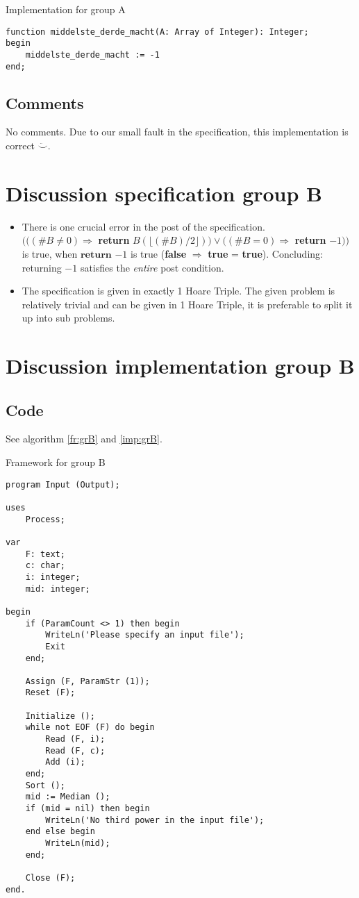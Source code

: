 \documentclass[a4paper,twoside,11pt]{article}
\begin{document}
\begin{algorithm}
\caption{Implementation for group A}
\label{imp:grA}
\begin{lstlisting}
function middelste_derde_macht(A: Array of Integer): Integer;
begin
    middelste_derde_macht := -1
end;
\end{lstlisting}
\end{algorithm}

\subsection{Comments}
No comments. Due to our small fault in the specification, this implementation is correct $\ddot\smile$.

\section{Discussion specification group B}
\begin{itemize}
    \item There is one crucial error in the post of the specification. \\
    $(((\#B \neq 0) \Rightarrow$ \textbf{return} $B( \lfloor{(\#B)/2} \rfloor)) \vee ((\#B = 0) \Rightarrow $ \textbf{return} $-1))$ is true, when $\mathbf{return}$ $-1$ is true (\textbf{false} $\Rightarrow$ \textbf{true} = \textbf{true}). Concluding: returning $-1$ satisfies the \emph{entire} post condition.
    \item The specification is given in exactly 1 Hoare Triple. The given problem is relatively trivial and can be given in 1 Hoare Triple, it is preferable to split it up into sub problems.
\end{itemize}
\newpage
\section{Discussion implementation group B}
\subsection{Code}
See algorithm \ref{fr:grB} and \ref{imp:grB}.

\begin{algorithm}
\caption{Framework for group B}
\label{fr:grB}
\begin{lstlisting}
program Input (Output);

uses
    Process;

var
    F: text;
    c: char;
    i: integer;
    mid: integer;

begin
    if (ParamCount <> 1) then begin
        WriteLn('Please specify an input file');
        Exit
    end;

    Assign (F, ParamStr (1));
    Reset (F);

    Initialize ();
    while not EOF (F) do begin
        Read (F, i);
        Read (F, c);
        Add (i);
    end;
    Sort ();
    mid := Median ();
    if (mid = nil) then begin
        WriteLn('No third power in the input file');
    end else begin
        WriteLn(mid);
    end;

    Close (F);
end.
\end{lstlisting}
\end{algorithm}
\end{document}
